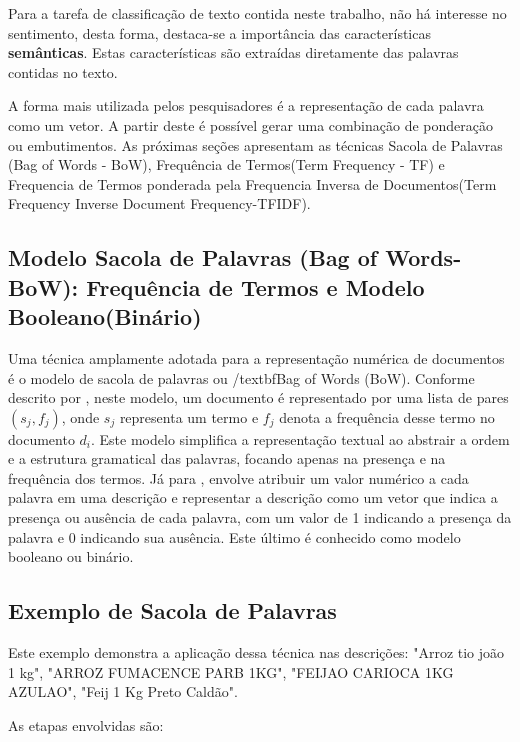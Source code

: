 Para a tarefa de classificação de texto contida neste trabalho, não há interesse no sentimento, desta forma, destaca-se a importância das características \textbf{semânticas}.  Estas características são extraídas diretamente das palavras contidas no texto.

A forma mais utilizada pelos pesquisadores é a representação de cada palavra como um vetor. A partir deste é possível gerar uma combinação de ponderação ou embutimentos.  As próximas seções apresentam as técnicas Sacola de Palavras (Bag of Words - BoW), Frequência de Termos(Term Frequency - TF) e Frequencia de Termos ponderada pela Frequencia Inversa de Documentos(Term Frequency Inverse Document Frequency-TFIDF).

\subsection{Modelo Sacola de Palavras (Bag of Words-BoW): Frequência de Termos e Modelo Booleano(Binário)}

Uma técnica amplamente adotada para a representação numérica de documentos é o modelo de sacola de palavras ou /textbf{Bag of Words (BoW)}. Conforme descrito por \cite{deng2019feature}, neste modelo, um documento é representado por uma lista de pares \((s_j, f_j)\), onde \(s_j\) representa um termo e \(f_j\) denota a frequência desse termo no documento \(d_i\). Este modelo simplifica a representação textual ao abstrair a ordem e a estrutura gramatical das palavras, focando apenas na presença e na frequência dos termos.  Já para \cite{zhang2010understanding}, envolve atribuir um valor numérico a cada palavra em uma descrição e representar a descrição como um vetor que indica a presença ou ausência de cada palavra, com um valor de 1 indicando a presença da palavra e 0 indicando sua ausência.  Este último é conhecido como modelo booleano ou binário.

\subsection{Exemplo de Sacola de Palavras}
\label{sec:exemplo-sacola-de-palavras}
Este exemplo demonstra a aplicação dessa técnica nas descrições: "Arroz tio joão 1 kg", "ARROZ FUMACENCE PARB 1KG", "FEIJAO CARIOCA 1KG AZULAO", "Feij 1 Kg Preto Caldão".  

As etapas envolvidas são:

